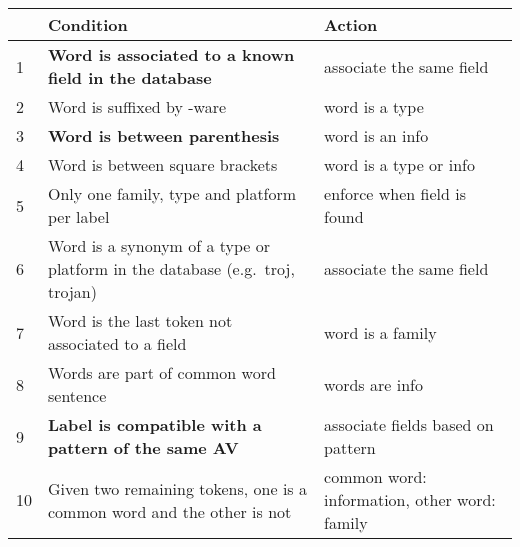 \begin{tabular}{|p{0.5cm}|p{6cm}|p{3.75cm}|}
    \hline
    & \textbf{Condition} &\textbf{Action} \\\hline
    1  & \textbf{Word is associated to a known field in the database}                & associate the same field \\\hline
    2  & Word is suffixed by -ware                                                   & word is a type \\\hline
    3  & \textbf{Word is between parenthesis}                                        & word is an info \\\hline
    4  & Word is between square brackets                                             & word is a type or info \\\hline
    5  & Only one family, type and platform per label                                & enforce when field is found \\\hline
    6  & Word is a synonym of a type or platform in the database (e.g.~troj, trojan) & associate the same field \\\hline
    7  & Word is the last token not associated to a field                            & word is a family \\\hline
    8  & Words are part of common word sentence                                      & words are info \\\hline
    9  & \textbf{Label is compatible with a pattern of the same AV}                  & associate fields based on pattern \\\hline
    10 & Given two remaining tokens, one is a common word and the other is not       & common word: information, other word: family \\\hline
\end{tabular}
